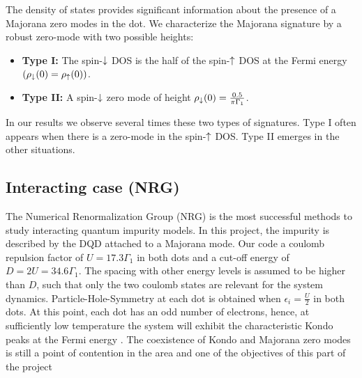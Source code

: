 \documentclass[showpacs,aps,prb,reprint,superscriptaddress]{revtex4-1}
\begin{document}
The density of states provides significant information about the presence of a Majorana zero modes in the dot. We characterize the Majorana signature by a robust zero-mode with two possible heights:
 \begin{itemize}
         \item \textbf{Type I: }  The spin-$\downarrow$ DOS is the half of the spin-$\uparrow$ DOS  at the Fermi energy $(\rho_\downarrow(0)=\rho_\uparrow(0))$. 
         \item \textbf{Type II: } A spin-$\downarrow$ zero mode of height $ \rho_\downarrow(0) = \frac{0.5}{\pi  \Gamma_1}$. 
     \end{itemize}
In our results we observe several times these two types of signatures. Type I often appears when there is a zero-mode in the spin-$\uparrow$ DOS. Type II emerges in the other situations. 



\subsection{Interacting case (NRG) \label{sec:NRG-interacting}}


The Numerical Renormalization Group (NRG) \cite{wilson_renormalization_1975,sindel_numerical_2005,bulla_numerical_2008} is the most successful methods to study interacting quantum impurity models. In this project, the impurity is described by the DQD attached to a Majorana mode. Our code a coulomb repulsion factor of $U =17.3\Gamma_1$ in both dots and a cut-off energy of $D=2U=34.6\Gamma_1$. The spacing with other energy levels is assumed to be higher than $D$, such that only the two coulomb states are relevant for the system dynamics. Particle-Hole-Symmetry at each dot is obtained when  $\epsilon_i = \frac{U}{2}$ in both dots. At this point, each dot has an odd number of electrons, hence, at sufficiently low temperature the system will exhibit the characteristic Kondo peaks at the Fermi energy \citet{wilson_renormalization_1975}. The coexistence of Kondo and Majorana zero modes is still a point of contention in the area and one of the objectives of this part of the project
\end{document}
